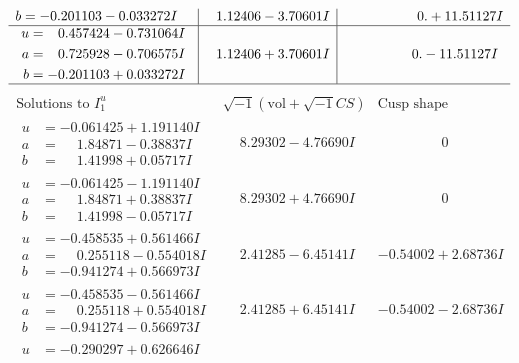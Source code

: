 \documentclass[1p]{elsarticle_modified}
\theoremstyle{definition}
\newcommand{\I}{\sqrt{-1}}
\begin{document}
$$\begin{array}{c|c|c}
\begin{aligned}
b &= -0.201103 - 0.033272 I\end{aligned}
 & \phantom{-}1.12406 - 3.70601 I & \phantom{-0.000000 -}0. + 11.51127 I \\ \hline\begin{aligned}
u &= \phantom{-}0.457424 - 0.731064 I \\
a &= \phantom{-}0.725928 - 0.706575 I \\
b &= -0.201103 + 0.033272 I\end{aligned}
 & \phantom{-}1.12406 + 3.70601 I & \phantom{-0.000000 } 0. - 11.51127 I\\
 \hline 
 \end{array}$$\newpage$$\begin{array}{c|c|c}  
\text{Solutions to }I^u_{1}& \I (\text{vol} + \sqrt{-1}CS) & \text{Cusp shape}\\
 \hline 
\begin{aligned}
u &= -0.061425 + 1.191140 I \\
a &= \phantom{-}1.84871 - 0.38837 I \\
b &= \phantom{-}1.41998 + 0.05717 I\end{aligned}
 & \phantom{-}8.29302 - 4.76690 I & \phantom{-0.000000 } 0 \\ \hline\begin{aligned}
u &= -0.061425 - 1.191140 I \\
a &= \phantom{-}1.84871 + 0.38837 I \\
b &= \phantom{-}1.41998 - 0.05717 I\end{aligned}
 & \phantom{-}8.29302 + 4.76690 I & \phantom{-0.000000 } 0 \\ \hline\begin{aligned}
u &= -0.458535 + 0.561466 I \\
a &= \phantom{-}0.255118 - 0.554018 I \\
b &= -0.941274 + 0.566973 I\end{aligned}
 & \phantom{-}2.41285 - 6.45141 I & -0.54002 + 2.68736 I \\ \hline\begin{aligned}
u &= -0.458535 - 0.561466 I \\
a &= \phantom{-}0.255118 + 0.554018 I \\
b &= -0.941274 - 0.566973 I\end{aligned}
 & \phantom{-}2.41285 + 6.45141 I & -0.54002 - 2.68736 I \\ \hline\begin{aligned}
u &= -0.290297 + 0.626646 I \\

\end{aligned}
\end{array}$$
\end{document}
